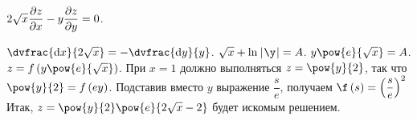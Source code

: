 \documentclass[a5paper,10pt]{article}
\begin{document}
    $2\sqrt{x} \dfrac{\partial z}{\partial x} - y \dfrac{\partial z}{\partial y} = 0$.
    
    $\dvfrac{\di x} {2\sqrt{x}} = -\dvfrac{\di y} {y}$.
    $\sqrt{x} + \ln\vbr{\y} = A$.
    $y \pow{e}{\sqrt{x}} = A$.
    $z = f\br{y \pow{e}{\sqrt{x}}}$.
    При $x = 1$ должно выполняться $z = \pow{y}{2}$, так что 
    $\pow{y}{2} = f\br{ey}$.
    Подставив вместо $y$ выражение $\dfrac {s} {e}$, получаем
    $\f\br{s} = \br{\dfrac {s} {e}}^2$
    Итак, $z = \pow{y}{2} \pow{e}{2\sqrt{x} - 2}$
    будет искомым решением.
\end{document}
